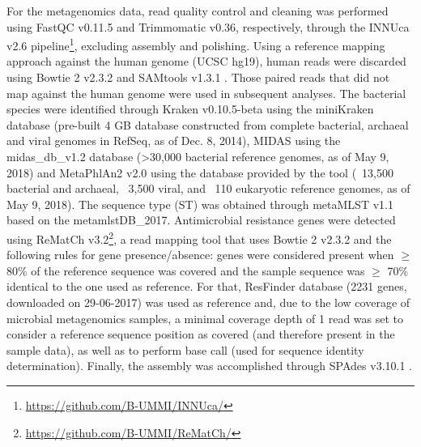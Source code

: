 For the metagenomics data, read quality control and cleaning was performed using FastQC v0.11.5 and Trimmomatic v0.36, respectively, through the INNUca v2.6 pipeline\footnote{\url{https://github.com/B-UMMI/INNUca/}}, excluding assembly and polishing. 
Using a reference mapping approach against the human genome (UCSC hg19), human reads were discarded using Bowtie 2 v2.3.2 \citep{langmead_fast_2012} and SAMtools v1.3.1 \citep{li_sequence_2009}. 
Those paired reads that did not map against the human genome were used in subsequent analyses. 
The bacterial species were identified through Kraken v0.10.5-beta \citep{wood_kraken_2014} using the miniKraken database (pre-built 4 GB database constructed from complete bacterial, archaeal and viral genomes in RefSeq, as of Dec. 8, 2014), MIDAS \citep{nayfach_integrated_2016} using the midas\_db\_v1.2 database (>30,000 bacterial reference genomes, as of May 9, 2018) and MetaPhlAn2 v2.0 \citep{segata_metagenomic_2012} using the database provided by the tool (~13,500 bacterial and archaeal, ~3,500 viral, and ~110 eukaryotic reference genomes, as of May 9, 2018). 
The sequence type (ST) was obtained through metaMLST v1.1 \citep{zolfo_metamlst_2017} based on the metamlstDB\_2017. 
Antimicrobial resistance genes were detected using ReMatCh v3.2\footnote{\url{https://github.com/B-UMMI/ReMatCh/}}, a read mapping tool that uses Bowtie 2 v2.3.2 \citep{langmead_fast_2012} and the following rules for gene presence/absence: genes were considered present when $\geq$ 80\% of the reference sequence was covered and the sample sequence was $\geq$ 70\% identical to the one used as reference. 
For that, ResFinder database (2231 genes, downloaded on 29-06-2017) was used as reference and, due to the low coverage of microbial metagenomics samples, a minimal coverage depth of 1 read was set to consider a reference sequence position as covered (and therefore present in the sample data), as well as to perform base call (used for sequence identity determination).
Finally, the assembly was accomplished through SPAdes v3.10.1 \citep{bankevich_spades_2012}.


